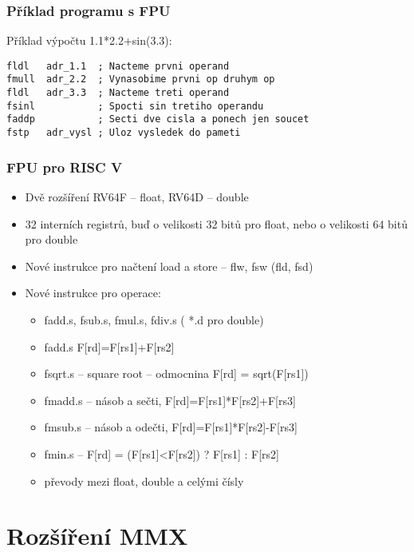 \documentclass{beamer}
\begin{document}
\begin{frame}[fragile]
\frametitle{Příklad programu s FPU}
Příklad výpočtu 1.1*2.2+sin(3.3):
\begin{lstlisting}[language={[x86masm]Assembler},columns=flexible]
fldl   adr_1.1  ; Nacteme prvni operand
fmull  adr_2.2  ; Vynasobime prvni op druhym op
fldl   adr_3.3  ; Nacteme treti operand
fsinl           ; Spocti sin tretiho operandu
faddp           ; Secti dve cisla a ponech jen soucet
fstp   adr_vysl ; Uloz vysledek do pameti
\end{lstlisting}

\end{frame}


\begin{frame}
\frametitle{FPU pro RISC V}
\begin{itemize}
\item Dvě rozšíření RV64F – float, RV64D – double
\item 32 interních registrů, buď o velikosti 32 bitů pro float, nebo o velikosti 64 bitů pro double
\item Nové instrukce pro načtení load a store – flw, fsw (fld, fsd)
\item Nové instrukce pro operace:
\begin{itemize}
\item fadd.s, fsub.s, fmul.s, fdiv.s ( *.d pro double)
\item fadd.s   F[rd]=F[rs1]+F[rs2] 
\item fsqrt.s -- square root -- odmocnina  F[rd] = sqrt(F[rs1])
\item fmadd.s -- násob a sečti, F[rd]=F[rs1]*F[rs2]+F[rs3]
\item fmsub.s -- násob a odečti, F[rd]=F[rs1]*F[rs2]-F[rs3]
\item fmin.s -- F[rd] = (F[rs1]<F[rs2]) ? F[rs1] : F[rs2]
\item převody mezi float, double a celými čísly
\end{itemize}
\end{itemize}
\end{frame}

\section{Rozšíření MMX}
\end{document}
